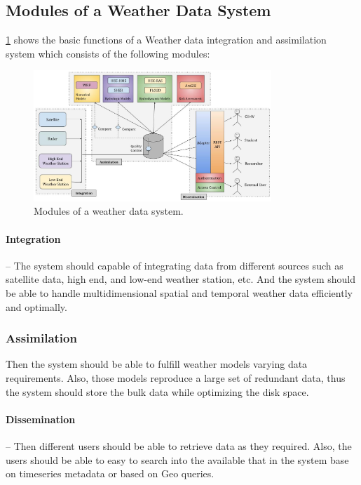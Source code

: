 \subsection{Modules of a Weather Data System}
\label{subse:modules_weather_data_integration_sys}

\cref{fi:wdia_components} shows the basic functions of a Weather data integration and assimilation system which consists of the following modules:

\begin{figure}[htbp]
\centerline{\includegraphics[width=0.8\textwidth]{method/misc/weather_data_system_components.jpg}}
\caption{Modules of a weather data system.}
\label{fi:wdia_components}
\end{figure}

\paragraph{Integration}-- The system should capable of integrating data from different sources such as satellite data, high end, and low-end weather station, etc. And the system should be able to handle multidimensional spatial and temporal weather data efficiently and optimally. 
\subsubsection{Assimilation}
Then the system should be able to fulfill weather models varying data requirements. Also, those models reproduce a large set of redundant data, thus the system should store the bulk data while optimizing the disk space.
\paragraph{Dissemination}-- Then different users should be able to retrieve data as they required. Also, the users should be able to easy to search into the available that in the system base on timeseries metadata or based on Geo queries.


